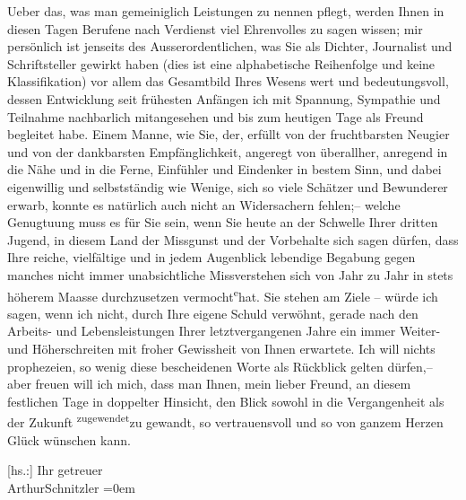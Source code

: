 \pstart
           Ueber das, was man gemeiniglich Leistungen zu nennen pflegt, werden Ihnen in diesen
               Tagen Berufene nach Verdienst viel Ehrenvolles zu sagen wissen; mir persönlich ist
                   jenseits 
               des Ausserordentlichen, was Sie als Dichter, Journalist und Schriftsteller gewirkt
               haben (dies ist eine alphabetische Reihenfolge und keine Klassifikation) {\pb}\introOben{}vor allem\introOben{} das Gesamtbild Ihres Wesens wert und
               bedeutungsvoll, dessen Entwicklung seit frühesten Anfängen ich mit Spannung,
               Sympathie und Teilnahme nachbarlich mitangesehen und bis zum heutigen Tage als Freund
               begleitet habe. Einem Manne, wie Sie, der, erfüllt von der fruchtbarsten Neugier und
               von der dankbarsten Empfänglichkeit, angeregt von überallher, anregend in die Nähe
               und in die Ferne, Einfühler und Eindenker in bestem Sinn, und dabei eigenwillig und
               selbstständig wie Wenige, sich so viele Schätzer und Bewunderer erwarb, konnte es
               natürlich auch nicht an Widersachern fehlen;– welche Genugtuung muss es für Sie sein,
               wenn Sie heute an der Schwelle Ihrer dritten Jugend, in diesem Land der Missgunst und
               der Vorbehalte sich sagen dürfen, dass Ihre reiche, vielfältige und in jedem
               Augenblick lebendige Begabung {\pb}gegen
               manches nicht immer unabsichtliche Missverstehen sich von Jahr zu Jahr in stets
               höherem Maasse durchzusetzen vermocht\substVorne{}\textsuperscript{e}\substDazwischen{}{ }hat\substHinten{}. Sie stehen am Ziele – würde ich sagen, wenn ich nicht, durch Ihre eigene
               Schuld verwöhnt, gerade nach den Arbeits- und Lebensleistungen Ihrer letztvergangenen
               Jahre ein immer Weiter- und Höherschreiten mit froher Gewissheit von Ihnen erwartete.
               Ich will nichts prophezeien, so wenig diese bescheidenen Worte als Rückblick gelten
               dürfen,– aber freuen  will ich mich, dass man
               Ihnen, mein lieber Freund, an diesem festlichen Tage in doppelter Hinsicht, den Blick
               sowohl in die Vergangenheit als der Zukunft \substVorne{}\textsuperscript{zugewendet}{\allowbreak}\substDazwischen{}zu gewandt\substHinten{}, so vertrauensvoll und so von ganzem Herzen Glück wünschen kann.\pend
           
\pstart
           {[}hs.:{]} Ihr getreuer{\\[\baselineskip]}\spacefill\mbox{ArthurSchnitzler}\pend
           \leftskip=0em{}\endnumbering{}  
      